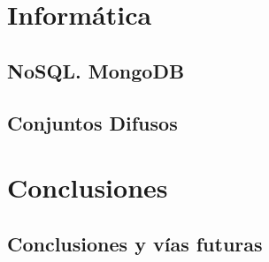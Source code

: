 \documentclass[ oneside,openany,titlepage,numbers=noenddot,headinclude,%
                footinclude=true,cleardoublepage=empty,abstractoff, %
                BCOR=5mm,paper=a4,fontsize=11pt,%
                spanish,american%
                ]{scrreprt}
\begin{document}
\part{Informática}

\chapter{NoSQL. MongoDB}


\chapter{Conjuntos Difusos}


\part{Conclusiones}

\chapter{Conclusiones y vías futuras}


%
\cleardoublepage
\cleardoublepage
\cleardoublepage
\end{document}
